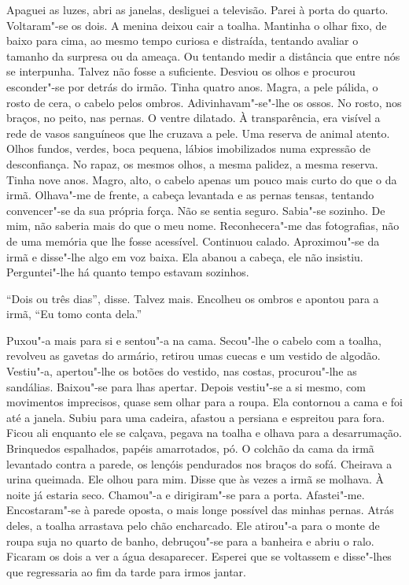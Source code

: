 Apaguei as luzes, abri as janelas, desliguei a televisão. Parei à porta
do quarto. Voltaram"-se os dois. A menina deixou cair a toalha. Mantinha
o olhar fixo, de baixo para cima, ao mesmo tempo curiosa e distraída,
tentando avaliar o tamanho da surpresa ou da ameaça. Ou tentando medir a
distância que entre nós se interpunha. Talvez não fosse a suficiente.
Desviou os olhos e procurou esconder"-se por detrás do irmão. Tinha
quatro anos. Magra, a pele pálida, o rosto de cera, o cabelo pelos
ombros. Adivinhavam"-se"-lhe os ossos. No rosto, nos braços, no peito,
nas pernas. O ventre dilatado. À transparência, era visível a rede de
vasos sanguíneos que lhe cruzava a pele. Uma reserva de animal atento.
Olhos fundos, verdes, boca pequena, lábios imobilizados numa expressão
de desconfiança. No rapaz, os mesmos olhos, a mesma palidez, a mesma
reserva. Tinha nove anos. Magro, alto, o cabelo apenas um pouco mais
curto do que o da irmã. Olhava"-me de frente, a cabeça levantada e as
pernas tensas, tentando convencer"-se da sua própria força. Não se
sentia seguro. Sabia"-se sozinho. De mim, não saberia mais do que o meu
nome. Reconhecera"-me das fotografias, não de uma memória que lhe fosse
acessível. Continuou calado. Aproximou"-se da irmã e disse"-lhe algo em
voz baixa. Ela abanou a cabeça, ele não insistiu. Perguntei"-lhe há
quanto tempo estavam sozinhos.

``Dois ou três dias'',
disse. Talvez mais. Encolheu os ombros e apontou para a irmã,
``Eu tomo conta dela.''

Puxou"-a mais para si e sentou"-a na cama. Secou"-lhe o cabelo com a
toalha, revolveu as gavetas do armário, retirou umas cuecas e um vestido
de algodão. Vestiu"-a, apertou"-lhe os botões do vestido, nas costas,
procurou"-lhe as sandálias. Baixou"-se para lhas apertar. Depois
vestiu"-se a si mesmo, com movimentos imprecisos, quase sem olhar para a
roupa. Ela contornou a cama e foi até a janela. Subiu para uma cadeira,
afastou a persiana e espreitou para fora. Ficou ali enquanto ele se
calçava, pegava na toalha e olhava para a desarrumação. Brinquedos
espalhados, papéis amarrotados, pó. O colchão da cama da irmã levantado
contra a parede, os lençóis pendurados nos braços do sofá. Cheirava a
urina queimada. Ele olhou para mim. Disse que às vezes a irmã se
molhava. À noite já estaria seco. Chamou"-a e dirigiram"-se para a
porta. Afastei"-me. Encostaram"-se à parede oposta, o mais longe
possível das minhas pernas. Atrás deles, a toalha arrastava pelo chão
encharcado. Ele atirou"-a para o monte de roupa suja no quarto de banho,
debruçou"-se para a banheira e abriu o ralo. Ficaram os dois a ver a
água desaparecer. Esperei que se voltassem e disse"-lhes que regressaria
ao fim da tarde para irmos jantar.

